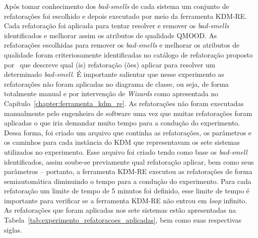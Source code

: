 Após tomar conhecimento dos \textit{bad-smells} de cada sistema um conjunto de refatorações foi escolhido e depois executado por meio da ferramenta KDM-RE. Cada refatoração foi aplicada para tentar resolver e remover os \textit{bad-smells} identificados e melhorar assim os atributos de qualidade QMOOD. As refatorações escolhidas para remover os \textit{bad-smells} e melhorar os atributos de qualidade foram criteriosamente identificadas no catálogo de refatoração proposto por~ que descreve qual (is) refatoração (ões) aplicar para resolver um determinado \textit{bad-smell}. É importante salientar que nesse experimento as refatorações não foram aplicadas no diagrama de classe, ou seja, de forma totalmente manual e por intervenção de \textit{Wizards} como apresentada no Capítulo~\ref{chapter:ferramenta_kdm_re}. As refatorações não foram executadas manualmente pelo engenheiro de software uma vez que muitas refatorações foram aplicadas o que iria demandar muito tempo para a condução do experimento. Dessa forma, foi criado um arquivo que continha as refatorações, os parâmetros e os caminhos para cada instância do KDM que representavam os sete sistemas utilizados no experimento. Esse arquivo foi criado tendo como base os \textit{bad-smell} identificados, assim soube-se previamente qual refatoração aplicar, bem como seus parâmetros – portanto, a ferramenta KDM-RE executou as refatorações de forma semiautomática diminuindo o tempo para a condução do experimento. Para cada refatoração um limite de tempo de 5 minutos foi definido, esse limite de tempo é importante para verificar se a ferramenta KDM-RE não entrou em \textit{loop} infinito.
As refatorações que foram aplicadas nos sete sistemas estão apresentadas na Tabela~\ref{tab:experimento_refatoracoes_aplicadas}, bem como suas respectivas siglas. 




